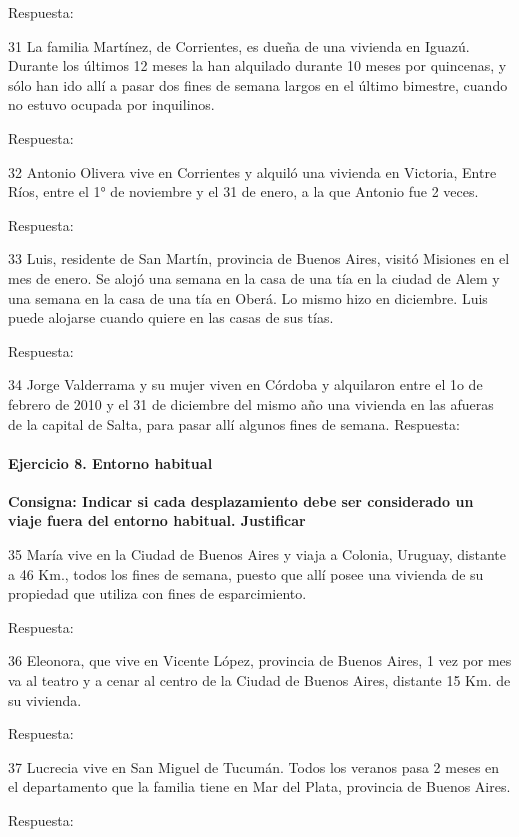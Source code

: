 \documentclass[
  openany]{book}
\begin{document}
Respuesta:

31 La familia Martínez, de Corrientes, es dueña de una vivienda en Iguazú. Durante los últimos 12 meses la han alquilado durante 10 meses por quincenas, y sólo han ido allí a pasar dos fines de semana largos en el último bimestre, cuando no estuvo ocupada por inquilinos.

Respuesta:

32 Antonio Olivera vive en Corrientes y alquiló una vivienda en Victoria, Entre Ríos, entre el 1° de noviembre y el 31 de enero, a la que Antonio fue 2 veces.

Respuesta:

33 Luis, residente de San Martín, provincia de Buenos Aires, visitó Misiones en el mes de enero. Se alojó una semana en la casa de una tía en la ciudad de Alem y una semana en la casa de una tía en Oberá. Lo mismo hizo en diciembre. Luis puede alojarse cuando quiere en las casas de sus tías.

Respuesta:

34 Jorge Valderrama y su mujer viven en Córdoba y alquilaron entre el 1o de febrero de 2010 y el 31 de diciembre del mismo año una vivienda en las afueras de la capital de Salta, para pasar allí algunos fines de semana. Respuesta:

\hypertarget{ejercicio-8.-entorno-habitual}{%
\paragraph{Ejercicio 8. Entorno habitual}\label{ejercicio-8.-entorno-habitual}}

\textbf{Consigna: Indicar si cada desplazamiento debe ser considerado un viaje fuera del entorno habitual. Justificar}

35 María vive en la Ciudad de Buenos Aires y viaja a Colonia, Uruguay, distante a 46 Km., todos los fines de semana, puesto que allí posee una vivienda de su propiedad que utiliza con fines de esparcimiento.

Respuesta:

36 Eleonora, que vive en Vicente López, provincia de Buenos Aires, 1 vez por mes va al teatro y a cenar al centro de la Ciudad de Buenos Aires, distante 15 Km. de su vivienda.

Respuesta:

37 Lucrecia vive en San Miguel de Tucumán. Todos los veranos pasa 2 meses en el departamento que la familia tiene en Mar del Plata, provincia de Buenos Aires.

Respuesta:
\end{document}
